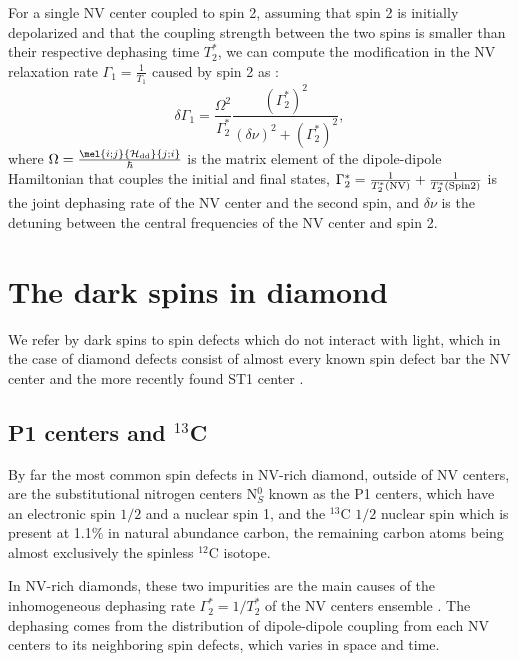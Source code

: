 \documentclass[a4paper,11pt]{report}
\begin{document}
\begin{refsection}
For a single NV center coupled to spin 2, assuming that spin 2 is initially depolarized and that the coupling strength between the two spins is smaller than their respective dephasing time $T_2^*$, we can compute the modification in the NV relaxation rate $\Gamma_1=\frac{1}{T_1}$ caused by spin 2 as \citep{hall2016detection}:
\begin{equation}
\delta \Gamma_1=\frac{\Omega^2}{\Gamma_2^*} \frac{(\Gamma_2^*)^2}{(\delta \nu)^2+(\Gamma_2^*)^2},
\label{delta gamma 1}
\end{equation}
where $\Omega=\frac{\mel{i;j}{\mathcal{H}_{\rm dd}}{j;i}}{\hbar}$ is the matrix element of the dipole-dipole Hamiltonian that couples the initial and final states, $\Gamma_2^*=\frac{1}{T_2^*(\rm NV)}+\frac{1}{T_2^*(\rm Spin 2)}$ is the joint dephasing rate of the NV center and the second spin, and $\delta \nu$ is the detuning between the central frequencies of the NV center and spin 2.
\section{The dark spins in diamond}

We refer by dark spins to spin defects which do not interact with light, which in the case of diamond defects consist of almost every known spin defect bar the NV center and the more recently found ST1 center \citep{lee2013readout, john2017bright}.

\subsection{P1 centers and $^{13}$C}
By far the most common spin defects in NV-rich diamond, outside of NV centers, are the substitutional nitrogen centers N$^0_S$ known as the P1 centers, which have an electronic spin $1/2$ and a nuclear spin 1, and the $^{13}$C $1/2$ nuclear spin which is present at 1.1\% in natural abundance carbon, the remaining carbon atoms being almost exclusively the spinless $^{12}$C isotope. 

In NV-rich diamonds, these two impurities are the main causes of the inhomogeneous dephasing rate $\Gamma_2^*=1/T_2^*$ of the NV centers ensemble \citep{barry2020sensitivity}. The dephasing comes from the distribution of dipole-dipole coupling from each NV centers to its neighboring spin defects, which varies in space and time. 


\end{refsection}
\end{document}
